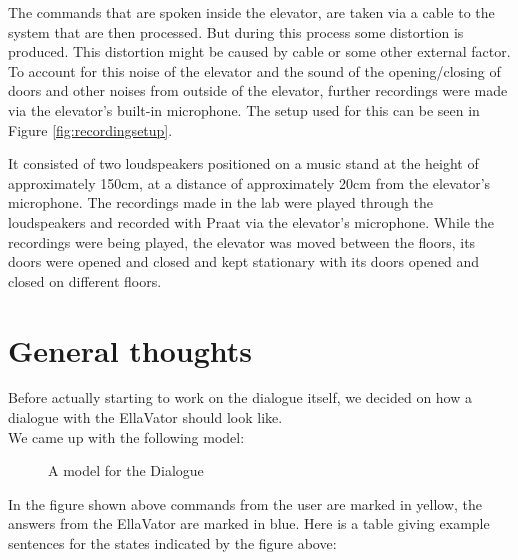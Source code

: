\documentclass[a4paper, 12pt]{article}
\begin{document}
The commands that are spoken inside the elevator, are taken via a cable to the system that are then processed. But during this process some distortion is produced. This distortion might be caused by cable or some other external factor. To account for this noise of the elevator and the sound of the opening/closing of doors and other noises from outside of the elevator, further recordings were made via the elevator's built-in microphone. The setup used for this can be seen in Figure \ref{fig:recordingsetup}.

It consisted of two loudspeakers positioned on a music stand at the height of approximately 150cm, at a distance of approximately 20cm from the elevator's microphone. 
The recordings made in the lab were played through the loudspeakers and recorded with Praat via the elevator's microphone. 
While the recordings were being played, the elevator was moved between the floors, its doors were opened and closed and kept stationary with its doors opened and closed on different floors.

\newpage
\section{General thoughts}
Before actually starting to work on the dialogue itself, we decided on how a dialogue with the EllaVator should look like. \\

We came up with the following model: \\


\begin{figure} [ht]
  \caption{A model for the Dialogue}
  \label{fig: Dialogue flow}
\end{figure}

In the figure shown above commands from the user are marked in yellow, the answers from the EllaVator are marked in blue.
Here is a table giving example sentences for the states indicated by the figure above: \\
\end{document}

